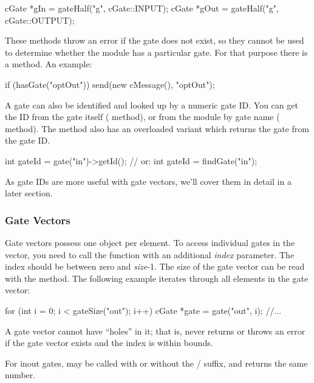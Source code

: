 \begin{cpp}
cGate *gIn = gateHalf("g", cGate::INPUT);
cGate *gOut = gateHalf("g", cGate::OUTPUT);
\end{cpp}

These methods throw an error if the gate does not exist, so they cannot
be used to determine whether the module has a particular gate.
For that purpose there is a  method. An example:

\begin{cpp}
if (hasGate("optOut"))
   send(new cMessage(), "optOut");
\end{cpp}

A gate can also be identified and looked up by a numeric gate ID.
You can get the ID from the gate itself ( method),
or from the module by gate name ( method).
The  method also has an overloaded variant which
returns the gate from the gate ID.

\begin{cpp}
int gateId = gate("in")->getId();  // or:
int gateId = findGate("in");
\end{cpp}

As gate IDs are more useful with gate vectors, we'll cover them
in detail in a later section.


\subsubsection{Gate Vectors}
\label{sec:simple-modules:gate-vectors}

Gate vectors possess one  object per element.
To access individual gates in the vector, you need to call
the  function with an additional \textit{index}
parameter. The index should be between zero and \textit{size}-1.
The size of the gate vector can be read with the 
method. The following example iterates through all elements in the
gate vector:

\begin{cpp}
for (int i = 0; i < gateSize("out"); i++) {
    cGate *gate = gate("out", i);
    //...
}
\end{cpp}

A gate vector cannot have ``holes'' in it; that is, 
never returns  or throws an error if the gate vector exists
and the index is within bounds.

For inout gates,  may be called with or without
the / suffix, and returns the same number.

